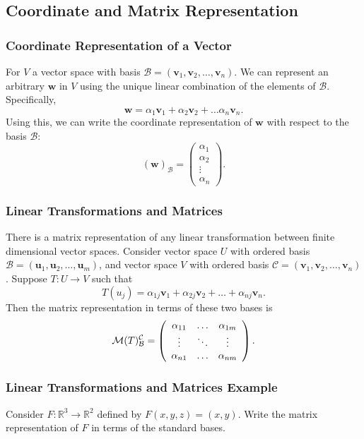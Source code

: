 \documentclass{beamer}
\begin{document}
\subsection{Coordinate and Matrix Representation} 

\begin{frame}
\frametitle{Coordinate Representation of a Vector}
For $V$ a vector space with basis $\mathcal{B} = ({\boldsymbol v_1}, {\boldsymbol  v_2},\ldots, {\boldsymbol  v_n})$. We can represent an arbitrary ${\boldsymbol  w}$ in $V$ using the unique linear combination of the elements of $\mathcal{B}$. Specifically, 
$$
{\boldsymbol  w} = \alpha_1 {\boldsymbol  v_1} + \alpha_2 {\boldsymbol  v_2} +\ldots \alpha_n {\boldsymbol  v_n}.
$$
Using this, we can write the coordinate representation of ${\boldsymbol  w}$ with respect to the basis $\mathcal{B}$:
$$
({\boldsymbol  w})_\mathcal{B} = \left(\begin{array}{c} \alpha_1\\ \alpha_2\\\vdots\\ \alpha_n\end{array}\right).
$$
\end{frame}

\begin{frame}
\frametitle{Linear Transformations and Matrices}
There is a matrix representation of any linear transformation between finite dimensional vector spaces. Consider vector space $U$ with ordered basis $\mathcal{B} = ({\boldsymbol u_1}, {\boldsymbol  u_2},\ldots, {\boldsymbol  u_m})$, and vector space $V$ with ordered basis $\mathcal{C} = ({\boldsymbol  v_1}, {\boldsymbol  v_2},\ldots, {\boldsymbol  v_n})$. Suppose $T: U\to V$ such that
$$
T(u_j) = \alpha_{1 j} {\boldsymbol  v_1} + \alpha_{2 j} {\boldsymbol  v_2} + \ldots + \alpha_{nj} {\boldsymbol  v_n}.
$$
Then the matrix representation in terms of these two bases is
$$
\mathcal{M}(T)_{\mathcal{B}}^{\mathcal{C}} = \left(\begin{array}{c c c c} \alpha_{11}	&	\ldots	&	\alpha_{1m}\\
												
													\vdots	& \ddots	&	\vdots\\
												\alpha_{n1}	&	\ldots	&	\alpha_{nm}\end{array}\right).
$$
\end{frame}

\begin{frame}[t]
\frametitle{Linear Transformations and Matrices Example}
\begin{Example}
Consider $F:\mathbb{R}^3\to \mathbb{R}^2$ defined by $F(x, y, z) = (x, y)$. Write the matrix representation of $F$ in terms of the standard bases.
\end{Example}

\end{frame}
\end{document}
